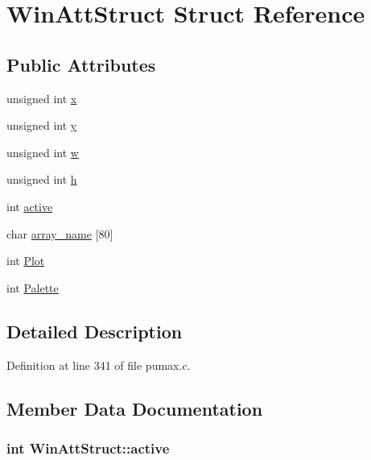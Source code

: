 \hypertarget{struct_win_att_struct}{
\section{\-Win\-Att\-Struct \-Struct \-Reference}
\label{struct_win_att_struct}
}
\subsection*{\-Public \-Attributes}
\begin{DoxyCompactItemize}
\item 
unsigned int \hyperlink{struct_win_att_struct_aa00d94640c9eb39ceac56f95c595f62a}{x}
\item 
unsigned int \hyperlink{struct_win_att_struct_a770cabf1d350db5890f636ccf30e5d47}{y}
\item 
unsigned int \hyperlink{struct_win_att_struct_a6e7f8041c23d41b7d2835a2b855d35f0}{w}
\item 
unsigned int \hyperlink{struct_win_att_struct_aa9c1c94dee4ebbe95eb392f738835055}{h}
\item 
int \hyperlink{struct_win_att_struct_abd4485f9d84ad074c80fc4127922cb19}{active}
\item 
char \hyperlink{struct_win_att_struct_a160c20895e7f5cd3463c955778f18338}{array\-\_\-name} \mbox{[}80\mbox{]}
\item 
int \hyperlink{struct_win_att_struct_ac172f6d90a125507144c20f703b4a0d4}{\-Plot}
\item 
int \hyperlink{struct_win_att_struct_a75ef0752e759450856fd5967bdb36587}{\-Palette}
\end{DoxyCompactItemize}


\subsection{\-Detailed \-Description}


\-Definition at line 341 of file pumax.\-c.



\subsection{\-Member \-Data \-Documentation}
\hypertarget{struct_win_att_struct_abd4485f9d84ad074c80fc4127922cb19}{
\subsubsection[{active}]{\setlength{\rightskip}{0pt plus 5cm}int {\bf \-Win\-Att\-Struct\-::active}}}
\label{struct_win_att_struct_abd4485f9d84ad074c80fc4127922cb19}


